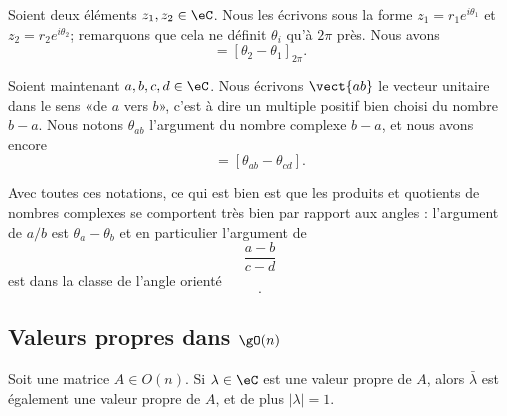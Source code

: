 Soient deux éléments \( z_1,z_2\in \eC\). Nous les écrivons sous la forme \( z_1=r_1 e^{i\theta_1}\) et \( z_2=r_2 e^{i\theta_2}\); remarquons que cela ne définit \( \theta_i\) qu'à \( 2\pi\) près. Nous avons
\begin{equation}
    [z_1,z_2]=[\theta_2-\theta_1]_{2\pi}.
\end{equation}

Soient maintenant \( a,b,c,d\in \eC\). Nous écrivons \( \vect{ ab }\) le vecteur unitaire dans le sens «de \( a\) vers \( b\)», c'est à dire un multiple positif bien choisi du nombre \( b-a\). Nous notons \( \theta_{ab}\) l'argument du nombre complexe \( b-a\), et nous avons encore
\begin{equation}
    [\vect{ ab },\vect{ cd }]=[\theta_{ab}-\theta_{cd}].
\end{equation}

Avec toutes ces notations, ce qui est bien est que les produits et quotients de nombres complexes se comportent très bien par rapport aux angles : l'argument de \( a/b\) est \( \theta_a-\theta_b\) et en particulier l'argument de 
\begin{equation}
    \frac{ a-b }{ c-d }
\end{equation}
est dans la classe de l'angle orienté
\begin{equation}
    [\vect{ ba },\vect{ dc }].
\end{equation}

\subsection{Valeurs propres dans \( \gO(n)\)}

\begin{proposition}      \label{PROPooVEJGooWnqtMm}
    Soit une matrice \( A\in O(n)\). Si \( \lambda\in \eC\) est une valeur propre de \( A\), alors \( \bar\lambda\) est également une valeur propre de \( A\), et de plus \( | \lambda |=1\).
\end{proposition}


